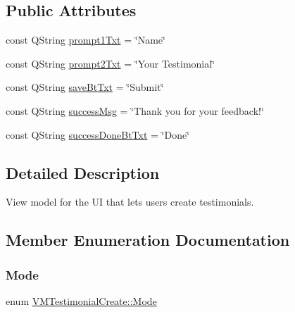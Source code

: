 \subsection*{Public Attributes}
\begin{DoxyCompactItemize}
\item 
const Q\+String \mbox{\hyperlink{class_v_m_testimonial_create_a9f799e8461e4a67f01b7b8b30deadd04}{prompt1\+Txt}} = \char`\"{}Name\char`\"{}
\item 
const Q\+String \mbox{\hyperlink{class_v_m_testimonial_create_ab293b8c3bfa9945a4381e5ec24c572da}{prompt2\+Txt}} = \char`\"{}Your Testimonial\char`\"{}
\item 
const Q\+String \mbox{\hyperlink{class_v_m_testimonial_create_af2b4326b5a7abd3f815df754880ae2d5}{save\+Bt\+Txt}} = \char`\"{}Submit\char`\"{}
\item 
const Q\+String \mbox{\hyperlink{class_v_m_testimonial_create_ad496e34b013e7d4ee879f8bc8eaa434b}{success\+Msg}} = \char`\"{}Thank you for your feedback!\char`\"{}
\item 
const Q\+String \mbox{\hyperlink{class_v_m_testimonial_create_afe5812a327160651286af17f65c62416}{success\+Done\+Bt\+Txt}} = \char`\"{}Done\char`\"{}
\end{DoxyCompactItemize}


\subsection{Detailed Description}
View model for the UI that lets users create testimonials. 



\subsection{Member Enumeration Documentation}
\mbox{\label{class_v_m_testimonial_create_a214643dddd4f760846692f71a9958e1a}} 
\subsubsection{\texorpdfstring{Mode}{Mode}}
{\footnotesize\ttfamily enum \mbox{\hyperlink{class_v_m_testimonial_create_a214643dddd4f760846692f71a9958e1a}{V\+M\+Testimonial\+Create\+::\+Mode}}}



